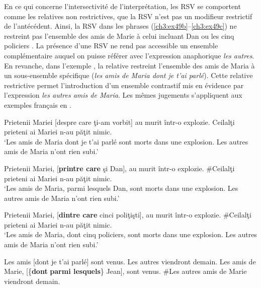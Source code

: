 En ce qui concerne l’intersectivité de l’interprétation, les RSV se comportent comme les relatives non restrictives, {\cad} que la RSV n’est pas un modifieur restrictif de l’antécédent. Ainsi, la RSV dans les phrases (\ref{ch3:ex49b}--\ref{ch3:ex49c}) ne restreint pas l’ensemble des amis de Marie à celui incluant Dan  ou les cinq policiers . La présence d’une RSV ne rend pas accessible un ensemble complémentaire auquel on puisse référer avec l’expression anaphorique \textit{les autres}. En revanche, dans l’exemple , la relative restreint l’ensemble des amis de Maria à un sous-ensemble spécifique (\textit{les amis de Maria dont je t’ai parlé}). Cette relative restrictive permet l’introduction d’un ensemble contrastif mis en évidence par l’expression \textit{les autres amis de Maria}. Les mêmes jugements s’appliquent aux exemples français en .

\ea \label{ch3:ex49} 
\ea 
Prietenii Mariei [despre care ţi-am vorbit] au murit într-o explozie. Ceilalţi prieteni ai Mariei n-au păţit nimic. \label{ch3:ex49a}\\
\glt ‘Les amis de Maria dont je t’ai parlé sont morts dans une explosion. Les autres amis de Maria n’ont rien subi.’

\ex
Prietenii Mariei, [\textbf{printre care} şi Dan], au murit într-o explozie. \#Ceilalţi prieteni ai Mariei n-au păţit nimic. \label{ch3:ex49b}\\
\glt ‘Les amis de Maria, parmi lesquels Dan, sont morts dans une explosion. Les autres amis de Maria n’ont rien subi.’

\ex 
Prietenii Mariei, [\textbf{dintre care} cinci poliţişti], au murit într-o explozie. \#Ceilalţi prieteni ai Mariei n-au păţit nimic. \label{ch3:ex49c}\\
\glt ‘Les amis de Maria, dont cinq policiers, sont morts dans une explosion. Les autres amis de Maria n’ont rien subi.’
\z 
\z


\ea \label{ch3:ex50} 
\ea
Les amis [dont je t’ai parlé] sont venus. Les autres viendront demain. \label{ch3:ex50a} 
\ex
Les amis de Marie, [\{\textbf{dont} {\textbar} \textbf{parmi lesquels}\} Jean], sont venus. \#Les autres amis de Marie viendront demain. \label{ch3:ex50b} 
\z 
\z 

